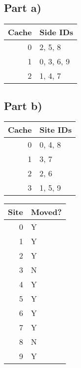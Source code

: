\documentclass[10pt,a4paper]{article}
\begin{document}
\subsection*{Part a)}

\begin{tabular}{rl}
Cache & Side IDs\\
\hline
0 & 2, 5, 8\\
1 & 0, 3, 6, 9\\
2 & 1, 4, 7\\
\end{tabular}
\begin{comment}
#+ORGTBL: SEND exercise-2-a orgtbl-to-latex :splice nil :skip 0
| Cache | Site IDs    |
|-------+------------|
|     0 | 2, 5, 8    |
|     1 | 0, 3, 6, 9 |
|     2 | 1, 4, 7    |
\end{comment}

\subsection*{Part b)}

\begin{tabular}{rl}
Cache & Site IDs\\
\hline
0 & 0, 4, 8\\
1 & 3, 7\\
2 & 2, 6\\
3 & 1, 5, 9\\
\end{tabular}
\begin{comment}
#+ORGTBL: SEND exercise-2-b orgtbl-to-latex :splice nil :skip 0
| Cache | Site IDs |
|-------+----------|
|     0 | 0, 4, 8  |
|     1 | 3, 7     |
|     2 | 2, 6     |
|     3 | 1, 5, 9  |
\end{comment}

\begin{tabular}{rl}
Site & Moved?\\
\hline
0 & Y\\
1 & Y\\
2 & Y\\
3 & N\\
4 & Y\\
5 & Y\\
6 & Y\\
7 & Y\\
8 & N\\
9 & Y\\
\end{tabular}
\begin{comment}
#+ORGTBL: SEND exercise-2-b-moved orgtbl-to-latex :splice nil :skip 0
| Site | Moved? |
|------+--------|
|    0 | Y      |
|    1 | Y      |
|    2 | Y      |
|    3 | N      |
|    4 | Y      |
|    5 | Y      |
|    6 | Y      |
|    7 | Y      |
|    8 | N      |
|    9 | Y      |
\end{comment}
\end{document}

